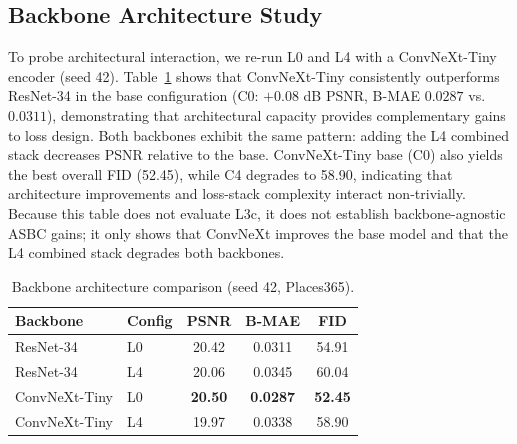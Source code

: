 \documentclass[10pt,conference]{IEEEtran}
\begin{document}
\subsection{Backbone Architecture Study}
\label{sec:backbone}

To probe architectural interaction, we re-run L0 and L4 with a
ConvNeXt-Tiny~\cite{liu2022convnet} encoder (seed 42).
Table~\ref{tab:backbone} shows that ConvNeXt-Tiny consistently outperforms
ResNet-34 in the base configuration (C0: $+0.08$ dB PSNR, B-MAE $0.0287$ vs.\ $0.0311$),
demonstrating that architectural capacity provides complementary gains to loss design.
Both backbones exhibit the same pattern: adding the L4 combined stack decreases PSNR
relative to the base.
ConvNeXt-Tiny base (C0) also yields the best overall FID (52.45), while C4 degrades to 58.90,
indicating that architecture improvements and loss-stack complexity interact non-trivially.
Because this table does not evaluate L3c, it does not establish backbone-agnostic
ASBC gains; it only shows that ConvNeXt improves the base model and that the L4
combined stack degrades both backbones.

\begin{table}[t]
  \centering
  \caption{Backbone architecture comparison (seed 42, Places365).}
  \label{tab:backbone}
  \setlength{\tabcolsep}{5pt}
  \begin{tabular}{llccc}
    \toprule
    \textbf{Backbone} & \textbf{Config}
      & \textbf{PSNR} & \textbf{B-MAE} & \textbf{FID} \\
    \midrule
    ResNet-34    & L0  & 20.42 & 0.0311 & 54.91 \\
    ResNet-34    & L4  & 20.06 & 0.0345 & 60.04 \\
    ConvNeXt-Tiny & L0 & \textbf{20.50} & \textbf{0.0287} & \textbf{52.45} \\
    ConvNeXt-Tiny & L4 & 19.97 & 0.0338 & 58.90 \\
    \bottomrule
  \end{tabular}
\end{table}
\end{document}

